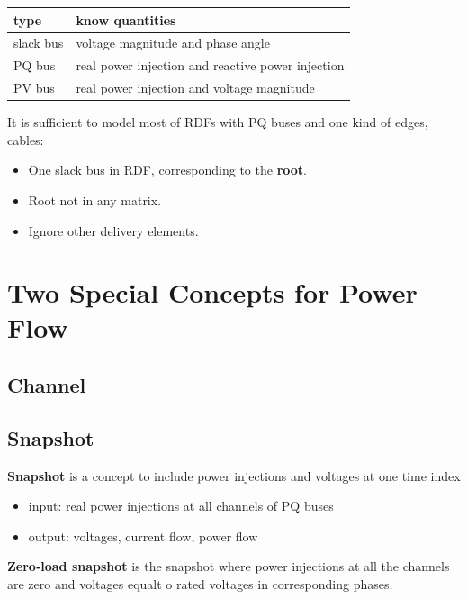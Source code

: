 \documentclass[
]{book}
\providecommand{\tightlist}{%
  \setlength{\itemsep}{0pt}\setlength{\parskip}{0pt}}
\begin{document}
\begin{table}[H]
\centering
\begin{tabular}[t]{l|l}
\hline
type & know quantities\\
\hline
slack bus & voltage magnitude and phase angle\\
\hline
PQ bus & real power injection and reactive power injection\\
\hline
PV bus & real power injection and voltage magnitude\\
\hline
\end{tabular}
\end{table}

It is sufficient to model most of RDFs with PQ buses and one kind of edges,
cables:

\begin{itemize}
\tightlist
\item
  One slack bus in RDF, corresponding to the \textbf{root}.
\item
  Root not in any matrix.
\item
  Ignore other delivery elements.
\end{itemize}

\hypertarget{two-special-concepts-for-power-flow}{%
\chapter{Two Special Concepts for Power Flow}\label{two-special-concepts-for-power-flow}}

\hypertarget{channel}{%
\section{Channel}\label{channel}}

\hypertarget{snapshot}{%
\section{Snapshot}\label{snapshot}}

\textbf{Snapshot} is a concept to include power injections and voltages at one time
index

\begin{itemize}
\tightlist
\item
  input: real power injections at all channels of PQ buses
\item
  output: voltages, current flow, power flow
\end{itemize}

\textbf{Zero‐load snapshot} is the snapshot where power injections at all the
channels are zero and voltages equalt o rated voltages in corresponding phases.
\end{document}
